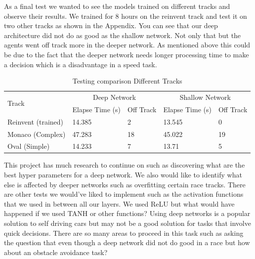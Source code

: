 \documentclass[journal]{IEEEtran}
\begin{document}
As a final test we wanted to see the models trained on different tracks and observe their results.  We trained for 8 hours on the reinvent track and test it on two other tracks as shown in the Appendix.  You can see that our deep architecture did not do as good as the shallow network.  Not only that but the agents went off track more in the deeper network.  As mentioned above this could be due to the fact that the deeper network needs longer processing time to make a decision which is a disadvantage in a speed task.

\begin{table}[t]
\centering
\caption{Testing comparison Different Tracks}
\begin{tabular}{ |p{2cm}|p{1.25cm}|p{1cm}|p{1.25cm}|p{1cm}| }
\hline
 \multirow{2}{4em}{Track} & \multicolumn{2}{|c|}{Deep Network} & \multicolumn{2}{|c|}{Shallow Network} \\
\cline{2-5}
 & Elapse Time (s) & Off Track &  Elapse Time (s) & Off Track  \\
\hline
Reinvent (trained) & 14.385	 & 2 & 13.545	 & 0 \\ 
 \hline
Monaco (Complex) & 47.283	 & 18 & 45.022	& 19 \\ 
 \hline
Oval (Simple) & 14.233	 & 7 & 13.71 & 5 \\ 
 \hline
\end{tabular}
\label{DiffRacetrackTest}
\end{table}


This project has much research to continue on such as discovering what are the best hyper parameters for a deep network.  We also would like to identify what else is affected by deeper networks such as overfitting certain race tracks.  There are other tests we would've liked to implement such as the activation functions that we used in between all our layers.  We used ReLU but what would have happened if we used TANH or other functions?  Using deep networks is a popular solution to self driving cars but may not be a good solution for tasks that involve quick decisions.  There are so many areas to proceed in this task such as asking the question that even though a deep network did not do good in a race but how about an obstacle avoidance task?
\end{document}

